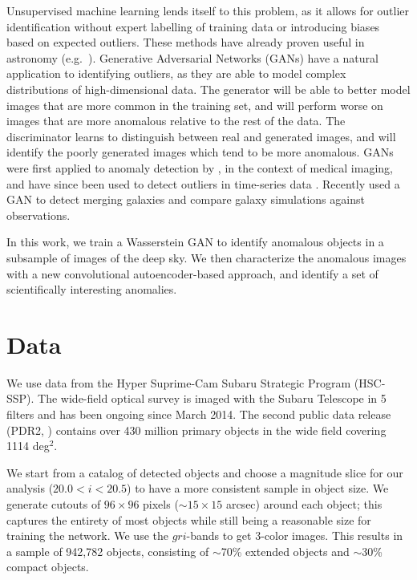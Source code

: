 \documentclass{article}
\begin{document}
Unsupervised machine learning lends itself to this problem, as it allows for outlier identification without expert labelling of training data or introducing biases based on expected outliers.
These methods have already proven useful in astronomy (e.g.~\citealp{Baron2017,Solarz2017,Giles2019,Ishida2019,Pruzhinskaya2019}).
Generative Adversarial Networks (GANs) have a natural application to identifying outliers, as they are able to model complex distributions of high-dimensional data.
The generator will be able to better model images that are more common in the training set, and will perform worse on images that are more anomalous relative to the rest of the data.
The discriminator learns to distinguish between real and generated images, and will identify the poorly generated images which tend to be more anomalous.
GANs were first applied to anomaly detection by \cite{Schlegl2017}, in the context of medical imaging, and have since been used to detect outliers in time-series data \citep{Li2018}.
Recently \cite{Margalef-Bentabol2020} used a GAN to detect merging galaxies and compare galaxy simulations against observations. 

In this work, we train a Wasserstein GAN to identify anomalous objects in a subsample of images of the deep sky.
We then characterize the anomalous images with a new convolutional autoencoder-based approach, and identify a set of scientifically interesting anomalies.

\section{Data}
\label{data}

We use data from the Hyper Suprime-Cam Subaru Strategic Program (HSC-SSP).
The wide-field optical survey is imaged with the Subaru Telescope in 5 filters and has been ongoing since March 2014.
The second public data release (PDR2, \citealt{Aihara2014}) contains over 430 million primary objects in the wide field covering 1114 deg$^2$.

We start from a catalog of detected objects and choose a magnitude slice for our analysis ($20.0<i<20.5$) to have a more consistent sample in object size. 
We generate cutouts of $96 \times 96$ pixels ($\sim15\times 15$ arcsec) around each object; this captures the entirety of most objects while still being a reasonable size for training the network.
We use the $gri$-bands to get 3-color images.
This results in a sample of 942,782 objects, consisting of $\sim$70\% extended objects and $\sim$30\% compact objects.
\end{document}
